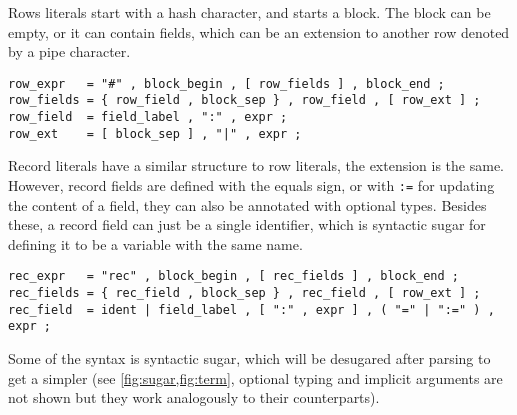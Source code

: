 Rows literals start with a hash character, and starts a block. The block can be
empty, or it can contain fields, which can be an extension to another row
denoted by a pipe character.
\begin{verbatim}
row_expr   = "#" , block_begin , [ row_fields ] , block_end ;
row_fields = { row_field , block_sep } , row_field , [ row_ext ] ;
row_field  = field_label , ":" , expr ;
row_ext    = [ block_sep ] , "|" , expr ;
\end{verbatim}

Record literals have a similar structure to row literals, the extension is the
same. However, record fields are defined with the equals sign, or with
\texttt{:=} for updating the content of a field,
they can also be annotated with optional types. Besides these, a record field
can just be a single identifier, which is syntactic sugar for defining it to be
a variable with the same name.
\begin{verbatim}
rec_expr   = "rec" , block_begin , [ rec_fields ] , block_end ;
rec_fields = { rec_field , block_sep } , rec_field , [ row_ext ] ;
rec_field  = ident | field_label , [ ":" , expr ] , ( "=" | ":=" ) , expr ;
\end{verbatim}

Some of the syntax is syntactic sugar, which will be desugared after parsing to
get a simpler  (see \cref{fig:sugar,fig:term}, optional typing and
implicit arguments are not shown but they work analogously to their
counterparts).

